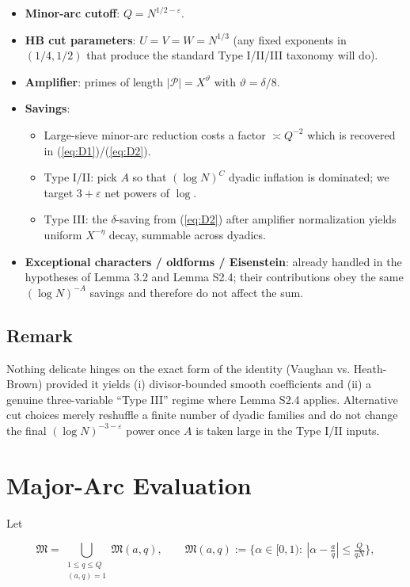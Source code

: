 \documentclass[11pt]{article}
\def\eqref#1{(\ref{#1})}%
\theoremstyle{definition}
\theoremstyle{remark}
\numberwithin{equation}{part}
\begin{document}
\begin{itemize}
	\item \textbf{Minor-arc cutoff}: $Q=N^{1/2-\varepsilon}$.
	\item \textbf{HB cut parameters}: $U=V=W=N^{1/3}$ (any fixed exponents in $(1/4,1/2)$ that produce the standard Type I/II/III taxonomy will do).
	\item \textbf{Amplifier}: primes of length $|\mathcal P|=X^\vartheta$ with $\vartheta=\delta/8$.
	\item \textbf{Savings}:
	      \begin{itemize}
		      \item Large-sieve minor-arc reduction costs a factor $\asymp Q^{-2}$ which is recovered in \eqref{eq:D1}/\eqref{eq:D2}.
		      \item Type I/II: pick $A$ so that $(\log N)^C$ dyadic inflation is dominated; we target $3+\varepsilon$ net powers of $\log$.
		      \item Type III: the $\delta$-saving from \eqref{eq:D2} after amplifier normalization yields uniform $X^{-\eta}$ decay, summable across dyadics.
	      \end{itemize}
	\item \textbf{Exceptional characters / oldforms / Eisenstein}: already handled in the hypotheses of Lemma 3.2 and Lemma S2.4; their contributions obey the same $(\log N)^{-A}$ savings and therefore do not affect the sum.
\end{itemize}

\subsection{Remark}

Nothing delicate hinges on the exact form of the identity (Vaughan vs. Heath-Brown) provided it yields (i) divisor-bounded smooth coefficients and (ii) a genuine three-variable “Type III” regime where Lemma S2.4 applies. Alternative cut choices merely reshuffle a finite number of dyadic families and do not change the final $(\log N)^{-3-\varepsilon}$ power once $A$ is taken large in the Type I/II inputs.

\section{Major-Arc Evaluation}

Let

$$
	\mathfrak M=\bigcup_{\substack{1\le q\le Q\\(a,q)=1}}\mathfrak M(a,q),\qquad
	\mathfrak M(a,q):=\{\alpha\in[0,1):\ |\alpha-\tfrac aq|\le \tfrac{Q}{qN}\},
$$
\end{document}
